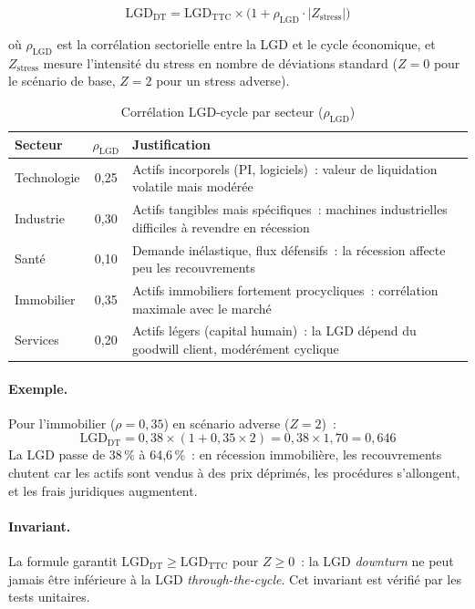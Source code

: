 \documentclass[12pt, a4paper, twoside, openright]{report}
\theoremstyle{definition}
\begin{document}
\begin{equation}
\text{LGD}_{\text{DT}} = \text{LGD}_{\text{TTC}} \times \bigl(1 + \rho_{\text{LGD}} \cdot |Z_{\text{stress}}|\bigr)
\label{eq:lgd-downturn}
\end{equation}

\noindent où $\rho_{\text{LGD}}$ est la corrélation sectorielle entre la LGD et le cycle économique, et $Z_{\text{stress}}$ mesure l'intensité du stress en nombre de déviations standard ($Z = 0$ pour le scénario de base, $Z = 2$ pour un stress adverse).

\begin{table}[htbp]
\centering
\caption{Corrélation LGD-cycle par secteur ($\rho_{\text{LGD}}$)}
\label{tab:rho-lgd}
\begin{tabular}{lcp{6cm}}
\toprule
Secteur & $\rho_{\text{LGD}}$ & Justification \\
\midrule
Technologie & 0{,}25 & Actifs incorporels (PI, logiciels)~: valeur de liquidation volatile mais modérée \\
Industrie & 0{,}30 & Actifs tangibles mais spécifiques~: machines industrielles difficiles à revendre en récession \\
Santé & 0{,}10 & Demande inélastique, flux défensifs~: la récession affecte peu les recouvrements \\
Immobilier & 0{,}35 & Actifs immobiliers fortement procycliques~: corrélation maximale avec le marché \\
Services & 0{,}20 & Actifs légers (capital humain)~: la LGD dépend du goodwill client, modérément cyclique \\
\bottomrule
\end{tabular}
\end{table}

\paragraph{Exemple.} Pour l'immobilier ($\rho = 0{,}35$) en scénario adverse ($Z = 2$)~:
$$\text{LGD}_{\text{DT}} = 0{,}38 \times (1 + 0{,}35 \times 2) = 0{,}38 \times 1{,}70 = 0{,}646$$
La LGD passe de 38\,\% à 64{,}6\,\%~: en récession immobilière, les recouvrements chutent car les actifs sont vendus à des prix déprimés, les procédures s'allongent, et les frais juridiques augmentent.

\paragraph{Invariant.} La formule garantit $\text{LGD}_{\text{DT}} \geq \text{LGD}_{\text{TTC}}$ pour $Z \geq 0$~: la LGD \emph{downturn} ne peut jamais être inférieure à la LGD \emph{through-the-cycle}. Cet invariant est vérifié par les tests unitaires.
\end{document}
